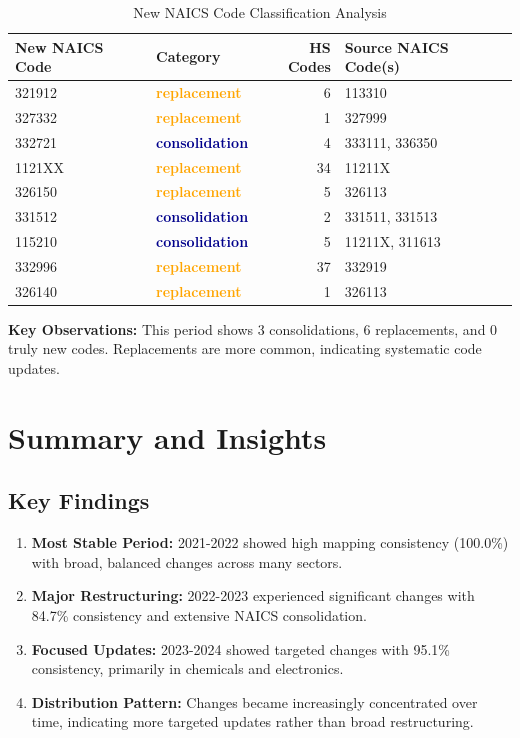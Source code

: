 \documentclass[11pt]{article}
\begin{document}
\begin{table}[H]
\centering
{}
\begin{tabular}{llrl}
\toprule
\textbf{New NAICS Code} & \textbf{Category} & \textbf{HS Codes} & \textbf{Source NAICS Code(s)} \\
\midrule
321912 & \textcolor{orange}{\textbf{replacement}} & 6 & 113310 \\
327332 & \textcolor{orange}{\textbf{replacement}} & 1 & 327999 \\
332721 & \textcolor{darkblue}{\textbf{consolidation}} & 4 & 333111, 336350 \\
1121XX & \textcolor{orange}{\textbf{replacement}} & 34 & 11211X \\
326150 & \textcolor{orange}{\textbf{replacement}} & 5 & 326113 \\
331512 & \textcolor{darkblue}{\textbf{consolidation}} & 2 & 331511, 331513 \\
115210 & \textcolor{darkblue}{\textbf{consolidation}} & 5 & 11211X, 311613 \\
332996 & \textcolor{orange}{\textbf{replacement}} & 37 & 332919 \\
326140 & \textcolor{orange}{\textbf{replacement}} & 1 & 326113 \\
\bottomrule
\end{tabular}
\caption{New NAICS Code Classification Analysis}
\end{table}

\textbf{Key Observations:} This period shows 3 consolidations, 6 replacements, and 0 truly new codes. Replacements are more common, indicating systematic code updates.

\newpage


\section{Summary and Insights}

\subsection{Key Findings}

\begin{enumerate}
    \item \textbf{Most Stable Period:} 2021-2022 showed high mapping consistency (100.0\%) with broad, balanced changes across many sectors.
    
    \item \textbf{Major Restructuring:} 2022-2023 experienced significant changes with 84.7\% consistency and extensive NAICS consolidation.
    
    \item \textbf{Focused Updates:} 2023-2024 showed targeted changes with 95.1\% consistency, primarily in chemicals and electronics.
    
    \item \textbf{Distribution Pattern:} Changes became increasingly concentrated over time, indicating more targeted updates rather than broad restructuring.
\end{enumerate}
\end{document}
